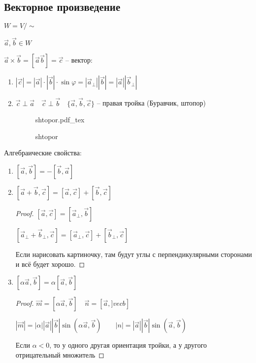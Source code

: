 \documentclass{book}
\theoremstyle{definition}
\newcommand{\incfig}[1]{%
    \def\svgwidth{\columnwidth}
    {#1.pdf_tex}
}
\begin{document}
\subsection{Векторное произведение}

$W = V / \sim $

$\vec a, \vec b \in W$

 $\vec a \times  \vec b = \left[ \vec a \vec b \right]  = \vec c$ -- вектор:
 \begin{enumerate}
     \item $\left| \vec c \right| = \left| \vec a \right| \cdot \left| \vec b \right| \cdot \sin \varphi  = \left| \vec a_{\perp} \right| \left| \vec b \right|  = \left| \vec a \right| \left| \vec b_{\perp} \right| $
     \item $\vec c \perp \vec a\quad \vec c \perp \vec b\quad \{ \vec a, \vec b, \vec c\}$ -- правая тройка (Буравчик, штопор)

\begin{figure}[ht]
    \centering
    \incfig{shtopor}
    \caption{shtopor}
    \label{fig:shtopor}
\end{figure}
 \end{enumerate}

 Алгебраические свойства:
 \begin{enumerate}
     \item $\left[ \vec a, \vec b \right] = -\left[ \vec b, \vec a \right]  $
     \item $\left[ \vec a + \vec b, \vec c \right]  = \left[ \vec a, \vec c \right]  + \left[ \vec b, \vec c \right] $
         \begin{proof}
             $[\vec a ,\vec c] = \left[ \vec a_{\perp}, \vec b \right] $ 

             $\left[ \vec a_{\perp} + \vec b_{\perp}, \vec c \right] = \left[ \vec a_{\perp}, \vec c \right] + \left[ \vec b_{\perp}, \vec c \right]  $

              Если нарисовать картиночку, там будут углы с перпендикулярными сторонами и всё будет хорошо.
         \end{proof}
     \item $\left[ \alpha \vec a, \vec b \right]  = \alpha \left[ \vec a, \vec b \right] $
         \begin{proof}
             $\vec m = \left[ \alpha\vec a, \vec b \right] \quad \vec n = \left[ \vec a, ]vec b \right] $ 

             $\left| \vec m \right| = \left| \alpha \right| \left| \vec a \right| \left| \vec b \right| \sin (\alpha \vec a, \vec b)\qquad \left| n \right|  = \left| \vec a \right| \left| \vec b \right| \sin (\vec a, \vec b)$ 

             Если $\alpha<0$, то у одного другая ориентация тройки, а у другого отрицательный множитель
         \end{proof}
 \end{enumerate}
\end{document}
